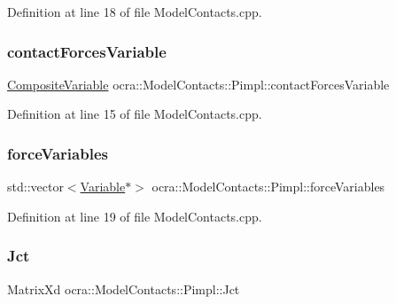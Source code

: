 Definition at line 18 of file Model\+Contacts.\+cpp.

\hypertarget{structocra_1_1ModelContacts_1_1Pimpl_a274e86267cd0b9dba8105fda27fda205}{}\label{structocra_1_1ModelContacts_1_1Pimpl_a274e86267cd0b9dba8105fda27fda205} 
\subsubsection{\texorpdfstring{contact\+Forces\+Variable}{contactForcesVariable}}
{\footnotesize\ttfamily \hyperlink{classocra_1_1CompositeVariable}{Composite\+Variable} ocra\+::\+Model\+Contacts\+::\+Pimpl\+::contact\+Forces\+Variable}



Definition at line 15 of file Model\+Contacts.\+cpp.

\hypertarget{structocra_1_1ModelContacts_1_1Pimpl_a133837a5c20241ac20b41c0fb7401682}{}\label{structocra_1_1ModelContacts_1_1Pimpl_a133837a5c20241ac20b41c0fb7401682} 
\subsubsection{\texorpdfstring{force\+Variables}{forceVariables}}
{\footnotesize\ttfamily std\+::vector$<$\hyperlink{classocra_1_1Variable}{Variable}$\ast$$>$ ocra\+::\+Model\+Contacts\+::\+Pimpl\+::force\+Variables}



Definition at line 19 of file Model\+Contacts.\+cpp.

\hypertarget{structocra_1_1ModelContacts_1_1Pimpl_ae11aa9cbd6a04aebd3039556c3da027b}{}\label{structocra_1_1ModelContacts_1_1Pimpl_ae11aa9cbd6a04aebd3039556c3da027b} 
\subsubsection{\texorpdfstring{Jct}{Jct}}
{\footnotesize\ttfamily Matrix\+Xd ocra\+::\+Model\+Contacts\+::\+Pimpl\+::\+Jct}



